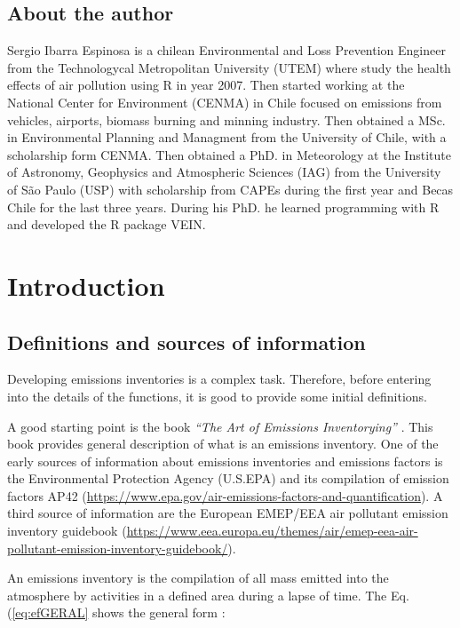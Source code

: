 \documentclass[12pt,graybox,envcountchap,sectrefs]{krantz}
\theoremstyle{definition}
\theoremstyle{definition}
\theoremstyle{definition}
\theoremstyle{remark}
\begin{document}
\section*{About the author}\label{about-the-author}


Sergio Ibarra Espinosa is a chilean Environmental and Loss Prevention
Engineer from the Technologycal Metropolitan University (UTEM) where
study the health effects of air pollution using R in year 2007. Then
started working at the National Center for Environment (CENMA) in Chile
focused on emissions from vehicles, airports, biomass burning and
minning industry. Then obtained a MSc. in Environmental Planning and
Managment from the University of Chile, with a scholarship form CENMA.
Then obtained a PhD. in Meteorology at the Institute of Astronomy,
Geophysics and Atmospheric Sciences (IAG) from the University of São
Paulo (USP) with scholarship from CAPEs during the first year and Becas
Chile for the last three years. During his PhD. he learned programming
with R and developed the R package VEIN.

\mainmatter

\chapter{Introduction}\label{intro}

\section{Definitions and sources of
information}\label{definitions-and-sources-of-information}

Developing emissions inventories is a complex task. Therefore, before
entering into the details of the functions, it is good to provide some
initial definitions.

A good starting point is the book \emph{``The Art of Emissions
Inventorying''} \citep{pulles2010art}. This book provides general
description of what is an emissions inventory. One of the early sources
of information about emissions inventories and emissions factors is the
Environmental Protection Agency (U.S.EPA) and its compilation of
emission factors AP42
(\url{https://www.epa.gov/air-emissions-factors-and-quantification}). A
third source of information are the European EMEP/EEA air pollutant
emission inventory guidebook
(\url{https://www.eea.europa.eu/themes/air/emep-eea-air-pollutant-emission-inventory-guidebook/}).

An emissions inventory is the compilation of all mass emitted into the
atmosphere by activities in a defined area during a lapse of time. The
Eq. (\eqref{eq:efGERAL} shows the general form \citep{guia}:
\end{document}

